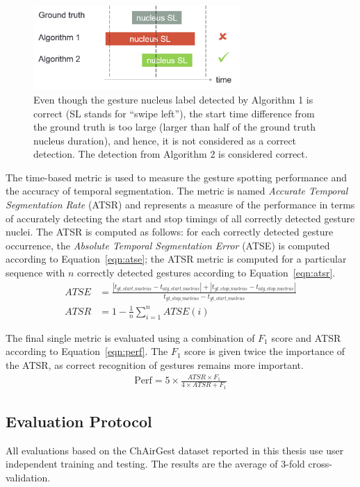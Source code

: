 \begin{figure}[tbh]
\centering
\includegraphics[width=0.7\textwidth]{figures/true_positive.png}
\caption{Even though the gesture nucleus label detected by Algorithm 1 is
correct (SL stands for ``swipe left''), the start time difference from the
ground truth is too large (larger than half of the ground truth nucleus
duration), and hence, it is not considered as a correct detection. The detection
from Algorithm 2 is considered correct.}
\label{fig:true-positive}
\end{figure}

The time-based metric is used to measure the gesture spotting performance and
the accuracy of temporal segmentation. The metric is named \textit{Accurate
Temporal Segmentation Rate} (ATSR) and represents a measure of the performance
in terms of accurately detecting the start and stop timings of all correctly
detected gesture nuclei. The ATSR is computed as follows: for each correctly detected gesture
occurrence, the \textit{Absolute Temporal Segmentation Error} (ATSE) is computed
according to Equation~\ref{eqn:atse}; the ATSR metric is computed for a
particular sequence with $n$ correctly detected gestures according to
Equation~\ref{eqn:atsr}.
\begin{align}
ATSE &= \frac{|t_{gt\_start\_nucleus} - t_{alg\_start\_nucleus}| +
|t_{gt\_stop\_nucleus} - t_{alg\_stop\_nucleus}|}{t_{gt\_stop\_nucleus} -
t_{gt\_start\_nucleus}} \label{eqn:atse} \\
ATSR &= 1 - \frac{1}{n}\sum_{i=1}^nATSE(i)
\label{eqn:atsr}
\end{align}

The final single metric is evaluated using a combination of $F_1$ score and ATSR
according to Equation~\ref{eqn:perf}. The $F_1$ score is given twice the
importance of the ATSR, as correct recognition of gestures remains more
important.
\begin{align}
\text{Perf} = 5\times \frac{ATSR\times F_1}{4\times ATSR + F_1}\label{eqn:perf}
\end{align}

\subsection{Evaluation Protocol}
All evaluations based on the ChAirGest dataset reported in this thesis use user
independent training and testing. The results are the average of 3-fold
cross-validation.
